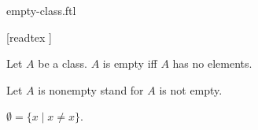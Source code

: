 \documentclass{stex}
\begin{document}
\begin{smodule}{empty-class.ftl}

  \begin{forthel}

    [readtex ]
  \end{forthel}

  \begin{forthel}
    \begin{definition}
      Let $A$ be a class.
      $A$ is empty iff $A$ has no elements.
    \end{definition}

    Let $A$ is nonempty stand for $A$ is not empty.
  \end{forthel}

  \begin{forthel}
    \begin{definition}
      $\emptyset = \{ x \mid x \neq x \}$.
    \end{definition}
  \end{forthel}
\end{smodule}
\end{document}
